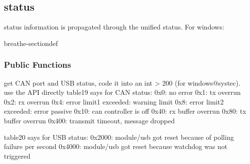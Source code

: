 \documentclass[a4paper,10pt,english]{sphinxmanual}
\begin{document}
\subsection{status}
\label{\detokenize{vendors/systec:status}}
\sphinxAtStartPar
status information is propagated through the unified status.
For windows:

\begin{fulllineitems}
\label{\detokenize{vendors/systec:_CPPv49STCanScan}}%
\pysigstartmultiline
{}%
\pysigstopmultiline
\begin{sphinxuseclass}{breathe-sectiondef}\subsubsection*{Public Functions}

\begin{fulllineitems}
\label{\detokenize{vendors/systec:_CPPv4N9STCanScan13getPortStatusEv}}%
\pysigstartmultiline
{}%
\pysigstopmultiline
\sphinxAtStartPar
get CAN port and USB status, code it into an int \textgreater{} 200 (for windows@systec). use the API directly table19 says for CAN status: 0x0: no error 0x1: tx overrun 0x2: rx overrun 0x4: error limit1 exceeded: warning limit 0x8: error limit2 exceeded: error passive 0x10: can controller is off 0x40: rx buffer overrun 0x80: tx buffer overrun 0x400: transmit timeout, message dropped

\sphinxAtStartPar
table20 says for USB status: 0x2000: module/usb got reset because of polling failure per second 0x4000: module/usb got reset because watchdog was not triggered 

\end{fulllineitems}


\end{sphinxuseclass}
\end{fulllineitems}
\end{document}
